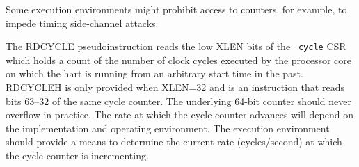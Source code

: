 \begin{commentary}
Some execution environments might prohibit access to counters, for
example, to impede timing side-channel attacks.
\end{commentary}

The RDCYCLE pseudoinstruction reads the low XLEN bits of the {\tt
  cycle} CSR which holds a count of the number of clock cycles
executed by the processor core on which the hart is running from an
arbitrary start time in the past.  RDCYCLEH is only provided when
XLEN=32 and is an instruction that reads bits 63--32 of the same cycle
counter.  The underlying 64-bit counter should never overflow in
practice.  The rate at which the cycle counter advances will depend on
the implementation and operating environment.  The execution
environment should provide a means to determine the current rate
(cycles/second) at which the cycle counter is incrementing.

